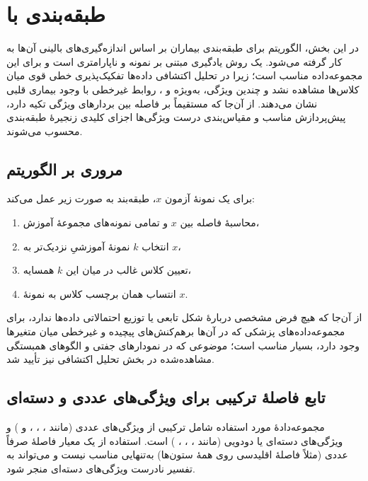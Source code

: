 \section{طبقه‌بندی با }

در این بخش، الگوریتم  برای طبقه‌بندی بیماران بر اساس اندازه‌گیری‌های
بالینی آن‌ها به کار گرفته می‌شود.  یک روش یادگیری مبتنی بر نمونه و ناپارامتری است و برای این
مجموعه‌داده مناسب است؛ زیرا در تحلیل اکتشافی داده‌ها تفکیک‌پذیری خطی قوی میان کلاس‌ها مشاهده نشد و
چندین ویژگی، به‌ویژه  و ، روابط غیرخطی با وجود بیماری قلبی نشان می‌دهند.
از آن‌جا که  مستقیماً بر فاصله بین بردارهای ویژگی تکیه دارد، پیش‌پردازش مناسب و مقیاس‌بندی
درست ویژگی‌ها اجزای کلیدی زنجیرهٔ طبقه‌بندی محسوب می‌شوند.

\subsection{مروری بر الگوریتم }

برای یک نمونهٔ آزمون $x$، طبقه‌بند  به صورت زیر عمل می‌کند:

\begin{enumerate}
	\item محاسبهٔ فاصله بین $x$ و تمامی نمونه‌های مجموعهٔ آموزش،
	\item انتخاب $k$ نمونهٔ آموزشیِ نزدیک‌تر به $x$،
	\item تعیین کلاس غالب در میان این $k$ همسایه،
	\item انتساب همان برچسب کلاس به نمونهٔ $x$.
\end{enumerate}

از آن‌جا که  هیچ فرض مشخصی دربارهٔ شکل تابعی یا توزیع احتمالاتی داده‌ها ندارد، برای
مجموعه‌داده‌های پزشکی که در آن‌ها برهم‌کنش‌های پیچیده و غیرخطی میان متغیرها وجود دارد، بسیار
مناسب است؛ موضوعی که در نمودارهای جفتی و الگوهای همبستگی مشاهده‌شده در بخش تحلیل اکتشافی نیز
تأیید شد.

\subsection{تابع فاصلهٔ ترکیبی برای ویژگی‌های عددی و دسته‌ای}

مجموعه‌دادهٔ مورد استفاده شامل ترکیبی از ویژگی‌های عددی (مانند ، ،
،  و ) و ویژگی‌های دسته‌ای یا دودویی (مانند ،
، ، ) است. استفاده از یک معیار فاصلهٔ صرفاً عددی (مثلاً
فاصلهٔ اقلیدسی روی همهٔ ستون‌ها) به‌تنهایی مناسب نیست و می‌تواند به تفسیر نادرست
ویژگی‌های دسته‌ای منجر شود.

